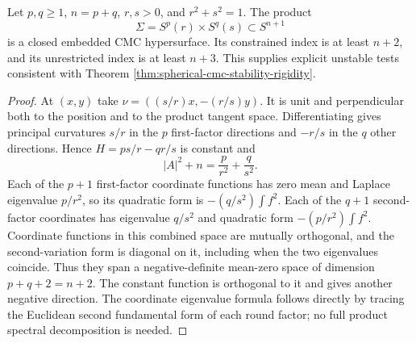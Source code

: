 \begin{example}\label{ex:cmc-product-torus-instability}
Let $p,q\geq1$, $n=p+q$, $r,s>0$, and $r^2+s^2=1$. The product
\[
 \Sigma=S^p(r)\times S^q(s)\subset S^{n+1}
\]
is a closed embedded CMC hypersurface. Its constrained index is at least $n+2$, and its unrestricted index is at least $n+3$. This supplies explicit unstable tests consistent with Theorem \ref{thm:spherical-cmc-stability-rigidity}.
\end{example}
\begin{proof}
At $(x,y)$ take $\nu=((s/r)x,-(r/s)y)$. It is unit and perpendicular both to the position and to the product tangent space. Differentiating gives principal curvatures $s/r$ in the $p$ first-factor directions and $-r/s$ in the $q$ other directions. Hence $H=ps/r-qr/s$ is constant and
\[
 |A|^2+n=\frac p{r^2}+\frac q{s^2}.
\]
Each of the $p+1$ first-factor coordinate functions has zero mean and Laplace eigenvalue $p/r^2$, so its quadratic form is $-(q/s^2)\int f^2$. Each of the $q+1$ second-factor coordinates has eigenvalue $q/s^2$ and quadratic form $-(p/r^2)\int f^2$. Coordinate functions in this combined space are mutually orthogonal, and the second-variation form is diagonal on it, including when the two eigenvalues coincide. Thus they span a negative-definite mean-zero space of dimension $p+q+2=n+2$. The constant function is orthogonal to it and gives another negative direction. The coordinate eigenvalue formula follows directly by tracing the Euclidean second fundamental form of each round factor; no full product spectral decomposition is needed.
\end{proof}
